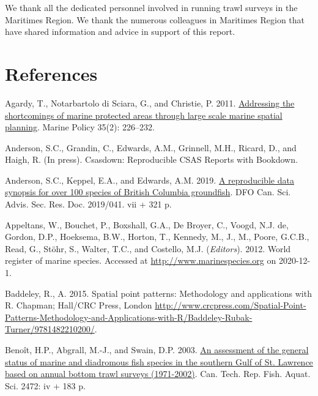 \documentclass[12pt]{article}\usepackage[]{graphicx}\usepackage[]{color}
\begin{document}
We thank all the dedicated personnel involved in running trawl surveys in the Maritimes Region. We thank the numerous colleagues in Maritimes Region that have shared information and advice in support of this report.

\clearpage

\hypertarget{references}{%
\section{References}\label{references}}

\noindent \vspace{-2em} \setlength{\parindent}{-0.2in} \setlength{\leftskip}{0.2in} \setlength{\parskip}{8pt}

\hypertarget{refs}{}
\leavevmode\hypertarget{ref-Agardy:2011}{}%
Agardy, T., Notarbartolo di Sciara, G., and Christie, P. 2011. \href{https://www.sciencedirect.com/science/article/pii/S0308597X10001740}{Addressing the shortcomings of marine protected areas through large scale marine spatial planning}. Marine Policy 35(2): 226--232.

\leavevmode\hypertarget{ref-R:csasdown}{}%
Anderson, S.C., Grandin, C., Edwards, A.M., Grinnell, M.H., Ricard, D., and Haigh, R. (In press). Csasdown: Reproducible CSAS Reports with Bookdown.

\leavevmode\hypertarget{ref-Anderson:2019}{}%
Anderson, S.C., Keppel, E.A., and Edwards, A.M. 2019. \href{https://www.dfo-mpo.gc.ca/csas-sccs/Publications/ResDocs-DocRech/2019/2019_041-eng.html}{A reproducible data synopsis for over 100 species of British Columbia groundfish}. DFO Can. Sci. Advis. Sec. Res. Doc. 2019/041. vii + 321 p.

\leavevmode\hypertarget{ref-WoRMS}{}%
Appeltans, W., Bouchet, P., Boxshall, G.A., De Broyer, C., Voogd, N.J. de, Gordon, D.P., Hoeksema, B.W., Horton, T., Kennedy, M., J., M., Poore, G.C.B., Read, G., Stöhr, S., Walter, T.C., and Costello, M.J. (\emph{Editors}). 2012. World register of marine species. Accessed at \url{http://www.marinespecies.org} on 2020-12-1.

\leavevmode\hypertarget{ref-R:package:spatstat}{}%
Baddeley, R., A. 2015. Spatial point patterns: Methodology and applications with R. Chapman; Hall/CRC Press, London \url{http://www.crcpress.com/Spatial-Point-Patterns-Methodology-and-Applications-with-R/Baddeley-Rubak-Turner/9781482210200/}.

\leavevmode\hypertarget{ref-Benoit:etal:2003:techreport}{}%
Benoît, H.P., Abgrall, M.-J., and Swain, D.P. 2003. \href{http://publications.gc.ca/site/eng/428386/publication.html}{An assessment of the general status of marine and diadromous fish species in the southern Gulf of St. Lawrence based on annual bottom trawl surveys (1971-2002)}. Can. Tech. Rep. Fish. Aquat. Sci. 2472: iv + 183 p.
\end{document}
